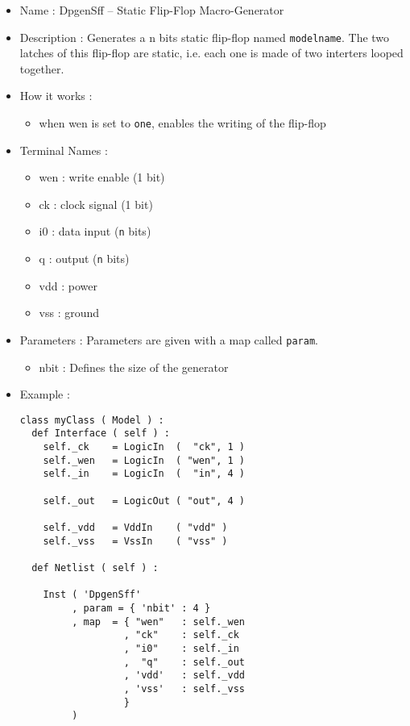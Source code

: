 \begin{itemize}
    \item Name : DpgenSff -- Static Flip-Flop Macro-Generator
    \item Description : Generates a n bits static flip-flop named \verb-modelname-. The two latches of this flip-flop are static, i.e. each one is made of two interters looped together.
    \item How it works : 
    \begin{itemize}
        \item  when wen is set to \verb-one-, enables the writing of the flip-flop
    \end{itemize}
    \item Terminal Names :
    \begin{itemize}
        \item wen : write enable (1 bit)
        \item ck : clock signal (1 bit)
        \item i0 : data input (\verb-n- bits)
        \item q : output (\verb-n- bits)
        \item vdd : power
        \item vss : ground
    \end{itemize}
    \item Parameters : Parameters are given with a map called \verb-param-.
    \begin{itemize}
        \item nbit : Defines the size of the generator
    \end{itemize}
    \item Example :
\begin{verbatim}
class myClass ( Model ) :
  def Interface ( self ) :
    self._ck    = LogicIn  (  "ck", 1 )
    self._wen   = LogicIn  ( "wen", 1 )
    self._in    = LogicIn  (  "in", 4 )
    
    self._out   = LogicOut ( "out", 4 )

    self._vdd   = VddIn    ( "vdd" )
    self._vss   = VssIn    ( "vss" )
    
  def Netlist ( self ) :
      
    Inst ( 'DpgenSff'
         , param = { 'nbit' : 4 }
         , map  = { "wen"   : self._wen
                  , "ck"    : self._ck
                  , "i0"    : self._in
                  ,  "q"    : self._out
                  , 'vdd'   : self._vdd
                  , 'vss'   : self._vss
                  }
         )
\end{verbatim}
\end{itemize}
